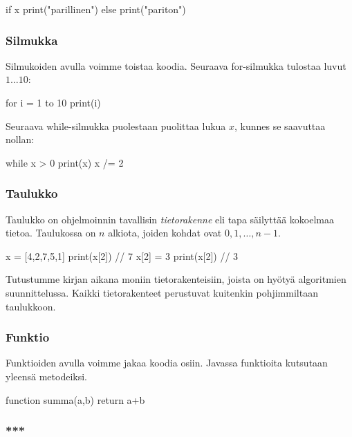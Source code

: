 \begin{code}
if x%
    print("parillinen")
else
    print("pariton")
\end{code}

\subsubsection{Silmukka}

Silmukoiden avulla voimme toistaa koodia.
Seuraava for-silmukka tulostaa luvut $1 \dots 10$:

\begin{code}
for i = 1 to 10
    print(i)
\end{code}

Seuraava while-silmukka puolestaan puolittaa lukua $x$,
kunnes se saavuttaa nollan:

\begin{code}
while x > 0
    print(x)
    x /= 2
\end{code}

\subsubsection{Taulukko}


Taulukko on ohjelmoinnin tavallisin \emph{tietorakenne}
eli tapa säilyttää kokoelmaa tietoa.
Taulukossa on $n$ alkiota, joiden kohdat ovat $0,1,\dots,n-1$.

\begin{code}
x = [4,2,7,5,1]
print(x[2]) // 7
x[2] = 3
print(x[2]) // 3
\end{code}

Tutustumme kirjan aikana moniin tietorakenteisiin,
joista on hyötyä algoritmien suunnittelussa.
Kaikki tietorakenteet perustuvat kuitenkin pohjimmiltaan taulukkoon.

\subsubsection{Funktio}

Funktioiden avulla voimme jakaa koodia osiin.
Javassa funktioita kutsutaan yleensä metodeiksi.

\begin{code}
function summa(a,b)
    return a+b
\end{code}

\subsubsection{***}

